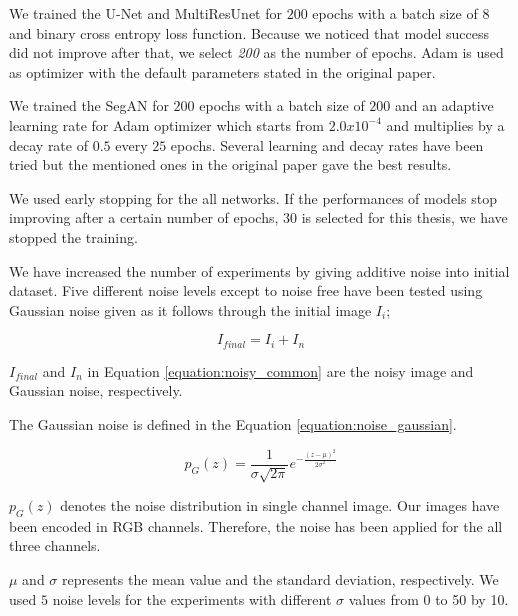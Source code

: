    We trained the U-Net and MultiResUnet for $200$ epochs with a batch size of $8$ and binary cross entropy loss function.
    Because we noticed that model success did not improve after that, we select \emph{200} as the number of epochs.
    Adam is used as optimizer with the default parameters stated in the original paper.

    We trained the SegAN for $200$ epochs with a batch size of $200$ and an adaptive learning rate for Adam optimizer
    which starts from $2.0 x 10^{-4}$ and multiplies by a decay rate of $0.5$ every $25$ epochs.
    Several learning and decay rates have been tried but the mentioned ones in the original paper gave the best results.

    We used early stopping for the all networks.
    If the performances of models stop improving after a certain number of epochs, $30$ is selected for this thesis, we have stopped the training.

    We have increased the number of experiments by giving additive noise into initial dataset.
    Five different noise levels except to noise free have been tested using Gaussian noise given as it follows through the
    initial image $I_i$;

    \begin{equation}
        I_{final} = I_i + I_n \label{equation:noisy_common}
    \end{equation}

    $I_{final}$ and $I_{n}$ in Equation \eqref{equation:noisy_common} are the noisy image and Gaussian noise, respectively.

    The Gaussian noise is defined in the Equation  \eqref{equation:noise_gaussian}.

    \begin{equation}
        p_G(z) = \frac{1}{\sigma\sqrt{2\pi}} e^{ -\frac{(z-\mu)^2}{2\sigma^2} }  \label{equation:noise_gaussian}
    \end{equation}

    $p_G(z)$ denotes the noise distribution in single channel image.
    Our images have been encoded in RGB channels. Therefore, the noise has been applied for the all three channels.

    $\mu$ and $\sigma$ represents the mean value and the standard deviation, respectively.
    We used $5$ noise levels for the experiments with different $\sigma$ values from 0 to 50 by 10.